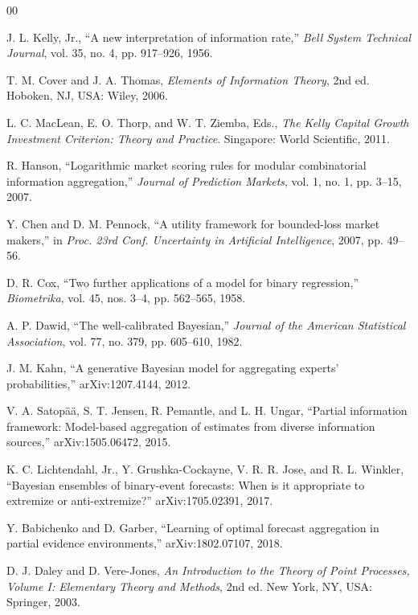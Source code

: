 \documentclass[journal,a4paper]{IEEEtran}
\begin{document}
\begin{thebibliography}{00}

J. L. Kelly, Jr., ``A new interpretation of information rate,'' \emph{Bell System Technical Journal}, vol. 35, no. 4, pp. 917--926, 1956.

T. M. Cover and J. A. Thomas, \emph{Elements of Information Theory}, 2nd ed. Hoboken, NJ, USA: Wiley, 2006.

L. C. MacLean, E. O. Thorp, and W. T. Ziemba, Eds., \emph{The Kelly Capital Growth Investment Criterion: Theory and Practice}. Singapore: World Scientific, 2011.

R. Hanson, ``Logarithmic market scoring rules for modular combinatorial information aggregation,'' \emph{Journal of Prediction Markets}, vol. 1, no. 1, pp. 3--15, 2007.

Y. Chen and D. M. Pennock, ``A utility framework for bounded-loss market makers,'' in \emph{Proc. 23rd Conf. Uncertainty in Artificial Intelligence}, 2007, pp. 49--56.

D. R. Cox, ``Two further applications of a model for binary regression,'' \emph{Biometrika}, vol. 45, nos. 3--4, pp. 562--565, 1958.

A. P. Dawid, ``The well-calibrated Bayesian,'' \emph{Journal of the American Statistical Association}, vol. 77, no. 379, pp. 605--610, 1982.

J. M. Kahn, ``A generative Bayesian model for aggregating experts' probabilities,'' arXiv:1207.4144, 2012.

V. A. Satop\"a\"a, S. T. Jensen, R. Pemantle, and L. H. Ungar, ``Partial information framework: Model-based aggregation of estimates from diverse information sources,'' arXiv:1505.06472, 2015.

K. C. Lichtendahl, Jr., Y. Grushka-Cockayne, V. R. R. Jose, and R. L. Winkler, ``Bayesian ensembles of binary-event forecasts: When is it appropriate to extremize or anti-extremize?'' arXiv:1705.02391, 2017.

Y. Babichenko and D. Garber, ``Learning of optimal forecast aggregation in partial evidence environments,'' arXiv:1802.07107, 2018.

D. J. Daley and D. Vere-Jones, \emph{An Introduction to the Theory of Point Processes, Volume I: Elementary Theory and Methods}, 2nd ed. New York, NY, USA: Springer, 2003.


\end{thebibliography}
\end{document}
